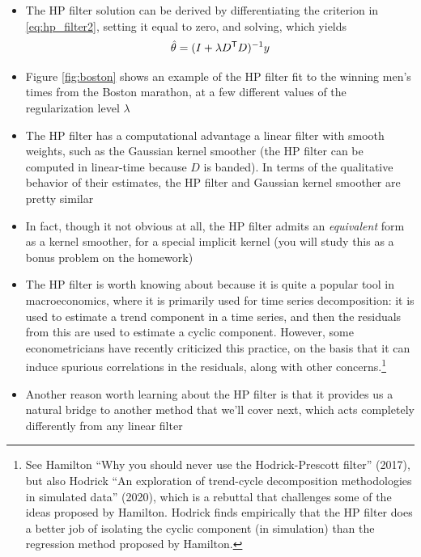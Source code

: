\documentclass{article}
\begin{document}
\begin{itemize}
\item The HP filter solution can be derived by differentiating the criterion in
  \eqref{eq:hp_filter2}, setting it equal to zero, and solving, which yields 
  \begin{equation}
  \label{eq:theta_hp}
  \hat{\theta} = (I + \lambda D^{\mathsf{T}} D)^{-1} y
  \end{equation}

\item Figure \ref{fig:boston} shows an example of the HP filter fit to the
  winning men's times from the Boston marathon, at a few different values of the
  regularization level $\lambda$

\item The HP filter has a computational advantage a linear filter with smooth
  weights, such as the Gaussian kernel smoother (the HP filter can be computed
  in linear-time because $D$ is banded). In terms of the qualitative behavior of
  their estimates, the HP filter and Gaussian kernel smoother are pretty similar    

\item In fact, though it not obvious at all, the HP filter admits an
  \emph{equivalent} form as a kernel smoother, for a special implicit kernel 
  (you will study this as a bonus problem on the homework) 

\item The HP filter is worth knowing about because it is quite a popular tool in
  macroeconomics, where it is primarily used for time series decomposition: it
  is used to estimate a trend component in a time series, and then the residuals
  from this are used to estimate a cyclic component. However, some
  econometricians have recently criticized this practice, on the basis that it
  can induce spurious correlations in the residuals, along with other
  concerns.\footnote{See Hamilton ``Why you should never use the
    Hodrick-Prescott filter'' (2017), but also Hodrick ``An exploration of
    trend-cycle decomposition methodologies in simulated data'' (2020), which is
    a rebuttal that challenges some of the ideas proposed by Hamilton. Hodrick
    finds empirically that the HP filter does a better job of isolating the
    cyclic component (in simulation) than the regression method proposed by 
    Hamilton.}  

\item Another reason worth learning about the HP filter is that it provides us a
  natural bridge to another method that we'll cover next, which acts completely 
  differently from any linear filter
\end{itemize}
\end{document}
